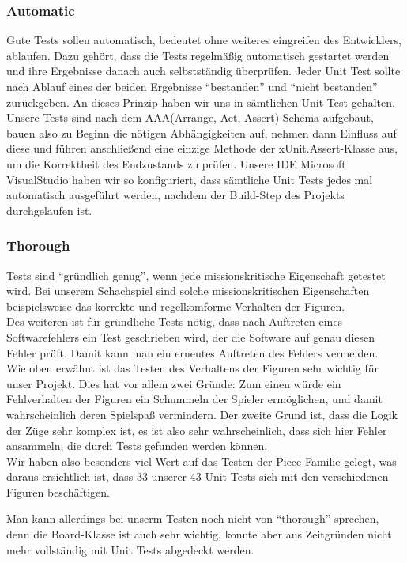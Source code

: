 \documentclass[
10pt, %
a4paper, %
oneside, %
headinclude,footinclude, %
BCOR5mm, %
]{scrartcl}
\begin{document}
\begin{onehalfspace}
\subsubsection{Automatic}
Gute Tests sollen automatisch, bedeutet ohne weiteres eingreifen des Entwicklers, ablaufen. Dazu gehört, dass die Tests regelmäßig automatisch gestartet werden und ihre Ergebnisse danach auch selbstständig überprüfen. Jeder Unit Test sollte nach Ablauf eines der beiden Ergebnisse \enquote{bestanden} und \enquote{nicht bestanden} zurückgeben.
An dieses Prinzip haben wir uns in sämtlichen Unit Test gehalten. Unsere Tests sind nach dem AAA(Arrange, Act, Assert)-Schema aufgebaut, bauen also zu Beginn die nötigen Abhängigkeiten auf, nehmen dann Einfluss auf diese und führen anschließend eine einzige Methode der xUnit.Assert-Klasse aus, um die Korrektheit des Endzustands zu prüfen. Unsere IDE Microsoft VisualStudio haben wir so konfiguriert, dass sämtliche Unit Tests jedes mal automatisch ausgeführt werden, nachdem der Build-Step des Projekts durchgelaufen ist.

\subsubsection{Thorough}
Tests sind \enquote{gründlich genug}, wenn jede missionskritische Eigenschaft getestet wird. Bei unserem Schachspiel sind solche missionskritischen Eigenschaften beispielsweise das korrekte und regelkomforme Verhalten der Figuren. 
\\
Des weiteren ist für gründliche Tests nötig, dass nach Auftreten eines Softwarefehlers ein Test geschrieben wird, der die Software auf genau diesen Fehler prüft. Damit kann man ein erneutes Auftreten des Fehlers vermeiden.
\\
Wie oben erwähnt ist das Testen des Verhaltens der Figuren sehr wichtig für unser Projekt. Dies hat vor allem zwei Gründe:
Zum einen würde ein Fehlverhalten der Figuren ein Schummeln der Spieler ermöglichen, und damit wahrscheinlich deren Spielspaß vermindern. 
Der zweite Grund ist, dass die Logik der Züge sehr komplex ist, es ist also sehr wahrscheinlich, dass sich hier Fehler ansammeln, die durch Tests gefunden werden können.
\\
Wir haben also besonders viel Wert auf das Testen der Piece-Familie gelegt, was daraus ersichtlich ist, dass 33 unserer 43 Unit Tests sich mit den verschiedenen Figuren beschäftigen.

Man kann allerdings bei unserm Testen noch nicht von \enquote{thorough} sprechen, denn die Board-Klasse ist auch sehr wichtig, konnte aber aus Zeitgründen nicht mehr vollständig mit Unit Tests abgedeckt werden.


\end{onehalfspace}
\end{document}
